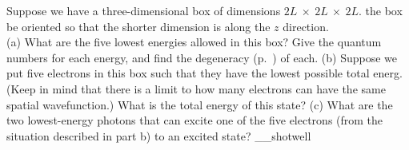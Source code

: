 Suppose we have a three-dimensional box of dimensions $2L\ \times\ 2L\ \times\ 2L$.
the box be oriented so that the shorter dimension is along the $z$ direction.\\
(a) What are the five lowest energies allowed in this box? Give the quantum numbers for each energy,
and find the degeneracy (p.~\pageref{subsubsec:degeneracy}) of each.\hwendpart
(b) Suppose we put five electrons in this box such that they have the lowest
possible total energ. (Keep in
mind that there is a limit to how many electrons can have the same spatial wavefunction.) What is the
total energy of this state?\answercheck\hwendpart
(c) What are the two lowest-energy photons that can excite one of the five electrons (from the situation
described in part b) to an excited state?\answercheck\hwendpart
__shotwell
